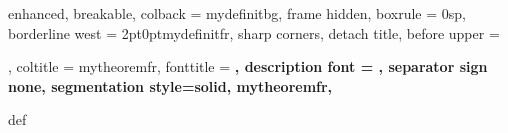 {%
	enhanced,
	breakable,
	colback = mydefinitbg,
	frame hidden,
	boxrule = 0sp,
	borderline west = {2pt}{0pt}{mydefinitfr},
	sharp corners,
	detach title,
	before upper = \tcbtitle\par\smallskip,
	coltitle = mytheoremfr,
	fonttitle = \bfseries\sffamily,
	description font = \mdseries,
	separator sign none,
	segmentation style={solid, mytheoremfr},
}
{def}






